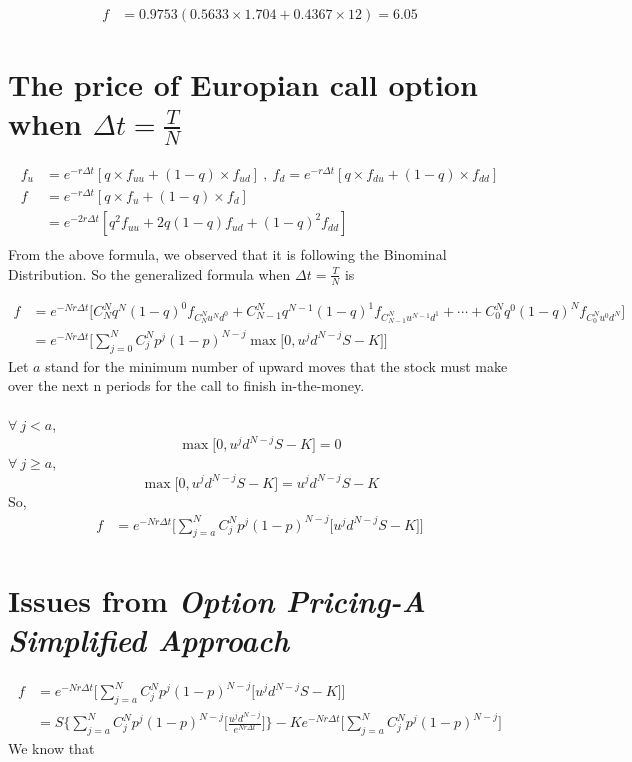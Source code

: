 \documentclass[12pt]{article}
\begin{document}
\begin{align*}
    f &= 0.9753(0.5633\times 1.704 + 0.4367 \times 12) = 6.05
\end{align*}

\newpage
\section{The price of Europian call option when $\Delta t = \frac{T}{N}$}
\begin{align*}
    f_u &= e^{-r\Delta t}[q\times f_{uu}+(1-q)\times f_{ud}]\ ,\ f_d = e^{-r\Delta t}[q\times f_{du}+(1-q)\times f_{dd}]\\
    f &= e^{-r\Delta t}[q\times f_{u}+(1-q)\times f_{d}]\\
    &= e^{-2r\Delta t}[q^2f_{uu} + 2q(1-q)f_{ud} + (1-q)^2f_{dd}]\\
\end{align*}
From the above formula, we observed that it is following the Binominal Distribution. So the generalized formula when $\Delta t = \frac{T}{N}$ is

\begin{align*}
    f &= e^{-Nr\Delta t}\Big[C_N^N q^N (1-q)^0 f_{C_N^N u^N d^0} + C_{N-1}^{N} q^{N-1} (1-q)^1 f_{C_{N-1}^{N} u^{N-1} d^1} + \cdots + C_0^N q^0 (1-q)^N f_{C_0^N u^0 d^N}\Big]\\
    &= e^{-Nr\Delta t}\Big[\sum_{j=0}^N C^N_j p^j (1-p)^{N-j}\max\big[0, u^j d^{N-j}S-K\big]\Big]
\end{align*}
Let $a$ stand for the minimum number of upward moves that the stock must make over the next n periods for the call to finish in-the-money.\\\\
$\forall\ j<a$,
\[
    \max\big[0, u^j d^{N-j}S-K\big] = 0
\]
$\forall\ j\ge a$,
\[
    \max\big[0, u^j d^{N-j}S-K\big] = u^j d^{N-j}S-K
\]
So,
\begin{align*}
    f &= e^{-Nr\Delta t} \Bigg[\sum_{j=a}^N C^N_j p^j (1-p)^{N-j} \big[u^j d^{N-j}S-K\big]\Bigg]
\end{align*}

\newpage

\section{Issues from \emph{Option Pricing-A Simplified Approach}}
\begin{align*}
    f &= e^{-Nr\Delta t} \Bigg[\sum_{j=a}^N C^N_j p^j (1-p)^{N-j} \big[u^j d^{N-j}S-K\big]\Bigg]\\
    & = S\Bigg\{\sum_{j=a}^N C^N_j p^j (1-p)^{N-j} \Bigg[\frac{u^j d^{N-j}}{e^{Nr\Delta t}}\Bigg]\Bigg\}-Ke^{-Nr\Delta t}\Bigg[\sum_{j=a}^N C^N_j p^j (1-p)^{N-j}\Bigg]
\end{align*}
We know that 
\end{document}
